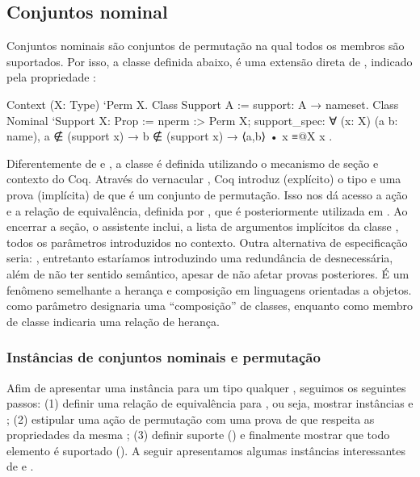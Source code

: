 \subsection{Conjuntos nominal}
Conjuntos nominais são conjuntos de permutação na qual todos os membros são suportados. Por isso, a classe  definida abaixo, é uma extensão direta de , indicado pela propriedade :
\begin{coqcode}
Context (X: Type) `{Perm X}.
Class Support A := support: A → nameset.
Class Nominal `{Support X}: Prop := {
   nperm :> Perm X;
   support_spec: ∀ (x: X) (a b: name),
      a ∉ (support x) → b ∉ (support x) → ⟨a,b⟩ • x ≡@{X} x
}.
\end{coqcode}
Diferentemente de  e , a classe  é definida utilizando o mecanismo de seção e contexto do Coq. Através do vernacular , Coq introduz (explícito) o tipo  e uma prova (implícita) de que é um conjunto de permutação. Isso nos dá acesso a ação e a relação de equivalência, definida por , que é posteriormente utilizada em . Ao encerrar a seção, o assistente inclui, a lista de argumentos implícitos da classe , todos os parâmetros introduzidos no contexto. Outra alternativa de especificação seria: , entretanto estaríamos introduzindo uma redundância de  desnecessária, além de não ter sentido semântico, apesar de não afetar provas posteriores. É um fenômeno semelhante a herança e composição em linguagens orientadas a objetos.  como parâmetro designaria uma ``composição'' de classes, enquanto como membro de classe indicaria uma relação de herança.


\subsubsection{Instâncias de conjuntos nominais e permutação}
Afim de apresentar uma instância  para um tipo qualquer , seguimos os seguintes passos: (1) definir uma relação de equivalência para , ou seja, mostrar instâncias  e ; (2) estipular uma ação de permutação  com uma prova de que respeita as propriedades da mesma ; (3) definir suporte () e finalmente mostrar que todo elemento é suportado (). A seguir apresentamos algumas instâncias interessantes de  e .

